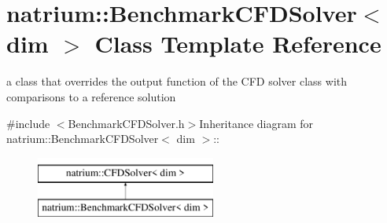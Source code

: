 \hypertarget{classnatrium_1_1BenchmarkCFDSolver}{
\section{natrium::BenchmarkCFDSolver$<$ dim $>$ Class Template Reference}
\label{classnatrium_1_1BenchmarkCFDSolver}
}


a class that overrides the output function of the CFD solver class with comparisons to a reference solution  


{\ttfamily \#include $<$BenchmarkCFDSolver.h$>$}Inheritance diagram for natrium::BenchmarkCFDSolver$<$ dim $>$::\begin{figure}[H]
\begin{center}
\leavevmode
\includegraphics[height=2cm]{classnatrium_1_1BenchmarkCFDSolver}
\end{center}
\end{figure}
